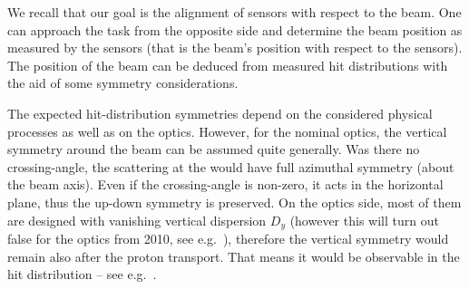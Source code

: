We recall that our goal is the alignment of  sensors with respect to the beam. One can approach the task from the opposite side and determine the beam position as measured by the  sensors (that is the beam's position with respect to the  sensors). The position of the beam can be deduced from measured hit distributions with the aid of some symmetry considerations.


\iffalse
\> beam position is the theoretical hit position of an elastic proton with $\th = 0$ and the mean vertex position.
\> (in our OfflineSW convention, the beam is at zero)
\> misalignements $\De q$ and RP positions $q^{\rm RP}$ (in accordance with \Eq{misalignment definition})
$$q^{\rm RP}(\hbox{actual/misaligned}) = q^{\rm RP}(\hbox{thought/nominal}) + \De q$$
therefore for hit positions $q$
$$q(\hbox{reconstructed with thought geometry}) = q(\hbox{real}) - \De q$$
\fi

The expected hit-distribution symmetries depend on the considered physical processes as well as on the optics. However, for the nominal optics, the vertical symmetry around the beam can be assumed quite generally. Was there no crossing-angle, the scattering at the  would have full azimuthal symmetry (about the beam axis). Even if the crossing-angle is non-zero, it acts in the horizontal plane, thus the up-down symmetry is preserved. On the optics side, most of them are designed with vanishing vertical dispersion $D_y$ (however this will turn out false for the optics from 2010, see e.g.~), therefore the vertical symmetry would remain also after the proton transport. That means it would be observable in the hit distribution -- see e.g.~.


